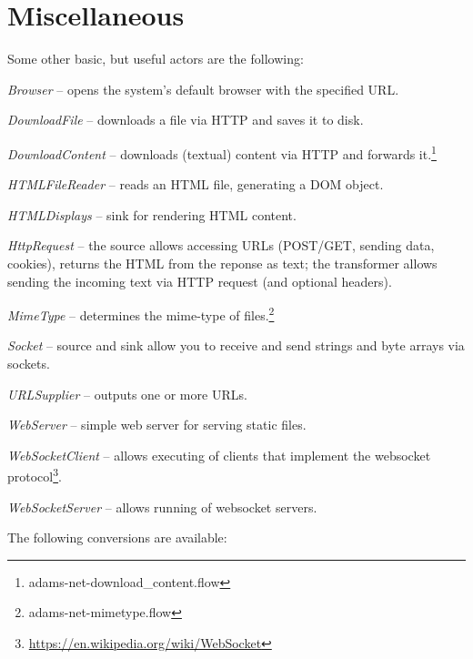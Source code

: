 \documentclass[a4paper]{book}
\begin{document}
\chapter{Miscellaneous}
Some other basic, but useful actors are the following:
\begin{tight_itemize}
	\item \textit{Browser} -- opens the system's default browser with the specified
	URL.
	\item \textit{DownloadFile} -- downloads a file via HTTP and saves it to disk.
	\item \textit{DownloadContent} -- downloads (textual) content via HTTP and 
	forwards it.\footnote{adams-net-download\_content.flow}
	\item \textit{HTMLFileReader} -- reads an HTML file, generating a DOM object.
	\item \textit{HTMLDisplays} -- sink for rendering HTML content.
	\item \textit{HttpRequest} -- the source allows accessing URLs (POST/GET, sending data,
	cookies), returns the HTML from the reponse as text; the transformer allows
	sending the incoming text via HTTP request (and optional headers).
	\item \textit{MimeType} -- determines the mime-type of
	files.\footnote{adams-net-mimetype.flow}
	\item \textit{Socket} -- source and sink allow you to receive and send
	strings and byte arrays via sockets.
	\item \textit{URLSupplier} -- outputs one or more URLs.
	\item \textit{WebServer} -- simple web server for serving static files.
	\item \textit{WebSocketClient} -- allows executing of clients that implement
	the websocket protocol\footnote{\url{https://en.wikipedia.org/wiki/WebSocket}{}}.
	\item \textit{WebSocketServer} -- allows running of websocket servers.
\end{tight_itemize}
The following conversions are available:
\end{document}
